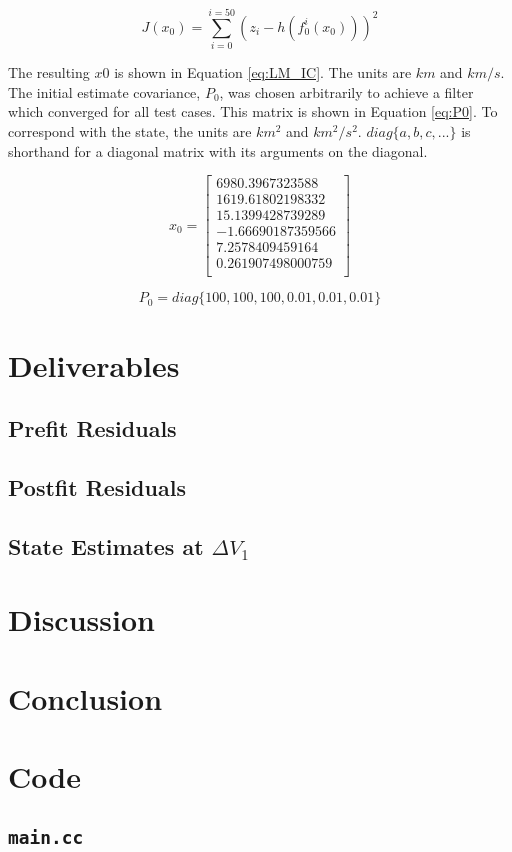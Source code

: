 \documentclass[11pt]{article}
\begin{document}
\begin{equation}
	\label{eq:ICcost}
	J(x_0) = \sum_{i=0}^{i=50} \left( z_i - h(f_{0}^{i}(x_0)) \right)^2 
\end{equation}

The resulting $x0$ is shown in Equation \eqref{eq:LM_IC}. The units are $km$ and $km/s$. The initial estimate covariance, $P_0$, was chosen arbitrarily to achieve a filter which converged for all test cases. This matrix is shown in Equation \eqref{eq:P0}. To correspond with the state, the units are $km^2$ and $km^2/s^2$. $diag \{a, b, c, ... \}$ is shorthand for a diagonal matrix with its arguments on the diagonal.

\begin{equation}
	\label{eq:LM_IC}
	x_0 = \begin{bmatrix}
	6980.3967323588 \\
	1619.61802198332 \\
	15.1399428739289 \\
	-1.66690187359566 \\
	7.2578409459164 \\
	0.261907498000759 \\	
	\end{bmatrix}
\end{equation}

\begin{equation}
	\label{eq:P0}
	P_0 = diag \{ 100, 100, 100, 0.01, 0.01, 0.01 \}
\end{equation}

\section{Deliverables}

\subsection{Prefit Residuals}

\subsection{Postfit Residuals}

\subsection{State Estimates at $\Delta V_1$}

\section{Discussion}

\section{Conclusion}


\newpage
\appendix
\section{Code}

\subsection{\texttt{main.cc}}


\end{document}
